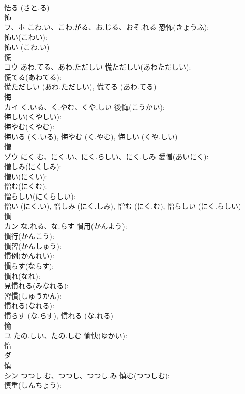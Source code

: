 \documentclass[8pt]{extreport}
\begin{document}
\begin{CJK}{UTF8}{min}
\\	悟る (さと.る)
\\	怖			
\\	フ、ホ	こわ.い、こわ.がる、お.じる、おそ.れる	恐怖(きょうふ): 
\\	怖い(こわい): 
\\	怖い (こわ.い)
\\	慌			
\\	コウ	あわ.てる、あわ.ただしい	慌ただしい(あわただしい): 
\\	慌てる(あわてる): 
\\	慌ただしい (あわ.ただしい), 慌てる (あわ.てる)
\\	悔			
\\	カイ	く.いる、く.やむ、くや.しい	後悔(こうかい): 
\\	悔しい(くやしい): 
\\	悔やむ(くやむ): 
\\	悔いる (く.いる), 悔やむ (く.やむ), 悔しい (くや.しい)
\\	憎			
\\	ゾウ	にく.む、にく.い、にく.らしい、にく.しみ	愛憎(あいにく): 
\\	憎しみ(にくしみ): 
\\	憎い(にくい): 
\\	憎む(にくむ): 
\\	憎らしい(にくらしい): 
\\	憎い (にく.い), 憎しみ (にく.しみ), 憎む (にく.む), 憎らしい (にく.らしい)
\\	慣			
\\	カン	な.れる、な.らす	慣用(かんよう): 
\\	慣行(かんこう): 
\\	慣習(かんしゅう): 
\\	慣例(かんれい): 
\\	慣らす(ならす): 
\\	慣れ(なれ): 
\\	見慣れる(みなれる): 
\\	習慣(しゅうかん): 
\\	慣れる(なれる): 
\\	慣らす (な.らす), 慣れる (な.れる)
\\	愉			
\\	ユ	たの.しい、たの.しむ	愉快(ゆかい): 
\\	惰			
\\	ダ			
\\	慎			
\\	シン	つつし.む、つつし、つつし.み	慎む(つつしむ): 
\\	慎重(しんちょう): 

\end{CJK}
\end{document}
